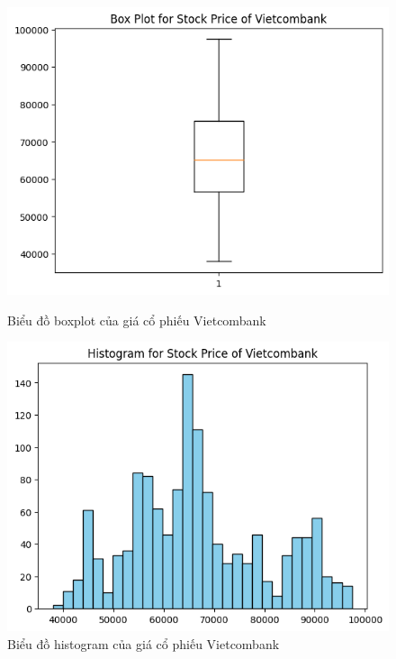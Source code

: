 \begin{figure}[H]
    \centering
    \begin{minipage}{0.23\textwidth}
    \centering
    \includegraphics[width=1\textwidth]{resources/chapter-3/newdata/Boxplot_Vietcombank.png}
    \caption{Biểu đồ boxplot của giá cổ phiếu Vietcombank}
    \label{fig:vcb_boxplot}
    \end{minipage}
    \hfill
    \begin{minipage}{0.23\textwidth}
    \centering
    \includegraphics[width=1\textwidth]{resources/chapter-3/newdata/Histogram_Vietcombank.png}
    \caption{Biểu đồ histogram của giá cổ phiếu Vietcombank}
    \label{fig:vcb_histogram}
    \end{minipage}
\end{figure}

